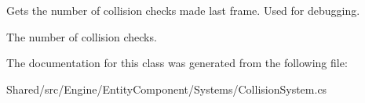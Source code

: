 Gets the number of collision checks made last frame. Used for debugging. 

The number of collision checks.

The documentation for this class was generated from the following file\+:\begin{DoxyCompactItemize}
\item 
Shared/src/\+Engine/\+Entity\+Component/\+Systems/Collision\+System.\+cs\end{DoxyCompactItemize}
